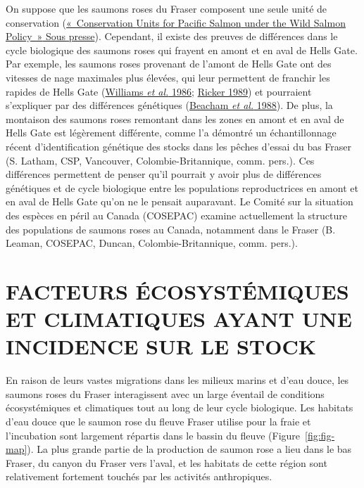 \documentclass[french,11pt]{book}
\begin{document}
On suppose que les saumons roses du Fraser composent une seule unité de conservation (\protect\hyperlink{ref-holtbyConservationUnitsPacific2008}{{«~Conservation {Units} for {Pacific Salmon} under the {W}ild {S}almon {P}olicy~»} Sous presse}). Cependant, il existe des preuves de différences dans le cycle biologique des saumons roses qui frayent en amont et en aval de Hells Gate. Par exemple, les saumons roses provenant de l'amont de Hells Gate ont des vitesses de nage maximales plus élevées, qui leur permettent de franchir les rapides de Hells Gate (\protect\hyperlink{ref-williams1983EarlyRun1986}{Williams \emph{et al.} 1986}; \protect\hyperlink{ref-rickerHistoryPresentState1989}{Ricker 1989}) et pourraient s'expliquer par des différences génétiques (\protect\hyperlink{ref-beachamVariationBodySize1988}{Beacham \emph{et al.} 1988}). De plus, la montaison des saumons roses remontant dans les zones en amont et en aval de Hells Gate est légèrement différente, comme l'a démontré un échantillonnage récent d'identification génétique des stocks dans les pêches d'essai du bas Fraser (S. Latham, CSP, Vancouver, Colombie-Britannique, comm. pers.). Ces différences permettent de penser qu'il pourrait y avoir plus de différences génétiques et de cycle biologique entre les populations reproductrices en amont et en aval de Hells Gate qu'on ne le pensait auparavant. Le Comité sur la situation des espèces en péril au Canada (COSEPAC) examine actuellement la structure des populations de saumons roses au Canada, notamment dans le Fraser (B. Leaman, COSEPAC, Duncan, Colombie-Britannique, comm. pers.).

\hypertarget{facteurs-uxe9cosystuxe9miques-et-climatiques-ayant-une-incidence-sur-le-stock}{%
\section{FACTEURS ÉCOSYSTÉMIQUES ET CLIMATIQUES AYANT UNE INCIDENCE SUR LE STOCK}\label{facteurs-uxe9cosystuxe9miques-et-climatiques-ayant-une-incidence-sur-le-stock}}

En raison de leurs vastes migrations dans les milieux marins et d'eau douce, les saumons roses du Fraser interagissent avec un large éventail de conditions écosystémiques et climatiques tout au long de leur cycle biologique. Les habitats d'eau douce que le saumon rose du fleuve Fraser utilise pour la fraie et l'incubation sont largement répartis dans le bassin du fleuve (Figure~\ref{fig:fig-map}). La plus grande partie de la production de saumon rose a lieu dans le bas Fraser, du canyon du Fraser vers l'aval, et les habitats de cette région sont relativement fortement touchés par les activités anthropiques.
\end{document}

